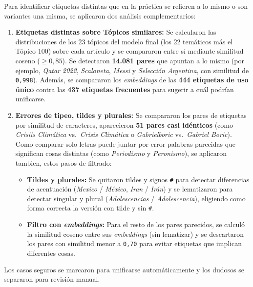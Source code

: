 \documentclass[
]{article}
\providecommand{\tightlist}{%
  \setlength{\itemsep}{0pt}\setlength{\parskip}{0pt}}
\begin{document}
Para identificar etiquetas distintas que en la práctica se refieren a lo
mismo o son variantes una misma, se aplicaron dos análisis
complementarios:

\begin{enumerate}
\def\labelenumi{\arabic{enumi}.}
\item
  \textbf{Etiquetas distintas sobre Tópicos similares:} Se calcularon
  las distribuciones de los 23 tópicos del modelo final (los 22
  temáticos más el Tópico 100) sobre cada artículo y se compararon entre
  sí mediante similitud coseno (\(\ge 0,85\)). Se detectaron
  \textbf{14.081 pares} que apuntan a lo mismo (por ejemplo, \emph{Qatar
  2022}, \emph{Scaloneta}, \emph{Messi} y \emph{Selección Argentina},
  con similitud de \texttt{0,998}). Además, se compararon los
  \emph{embeddings} de las \textbf{444 etiquetas de uso único} contra
  las \textbf{437 etiquetas frecuentes} para sugerir a cuál podrían
  unificarse.
\item
  \textbf{Errores de tipeo, tildes y plurales:} Se compararon los pares
  de etiquetas por similitud de caracteres, aparecieron \textbf{51 pares
  casi idénticos} (como \emph{Crisiis Climática} vs.~\emph{Crisis
  Climática} o \emph{Gabrielboric} vs.~\emph{Gabriel Boric}). Como
  comparar solo letras puede juntar por error palabras parecidas que
  significan cosas distintas (como \emph{Periodismo} y
  \emph{Peronismo}), se aplicaron tambien, estos pasos de filtrado:

  \begin{itemize}
  \tightlist
  \item
    \textbf{Tildes y plurales:} Se quitaron tildes y signos \texttt{\#}
    para detectar diferencias de acentuación (\emph{Mexico} /
    \emph{México}, \emph{Iran} / \emph{Irán}) y se lematizaron para
    detectar singular y plural (\emph{Adolescencias} /
    \emph{Adolescencia}), eligiendo como forma correcta la versión con
    tilde y sin \texttt{\#}.
  \item
    \textbf{Filtro con \emph{embeddings}:} Para el resto de los pares
    parecidos, se calculó la similitud coseno entre sus
    \emph{embeddings} (sin lematizar) y se descartaron los pares con
    similitud menor a \texttt{0,70} para evitar etiquetas que implican
    diferentes cosas.
  \end{itemize}
\end{enumerate}

Los casos seguros se marcaron para unificarse automáticamente y los
dudosos se separaron para revisión manual.
\end{document}
